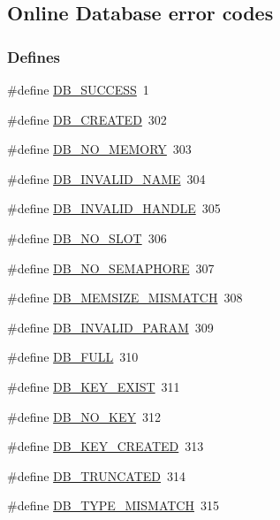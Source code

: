\subsection{Online Database error codes}
\label{group__err23}
\subsubsection*{Defines}
\begin{DoxyCompactItemize}
\item 
\#define \hyperlink{group__err23_ga4d6ab4d32144d851ddeb7931b81a63e3}{DB\_\-SUCCESS}~1
\item 
\#define \hyperlink{group__err23_gabd18ddb49dba3429ea159610875283ec}{DB\_\-CREATED}~302
\item 
\#define \hyperlink{group__err23_ga53ba0057ac441528c24b8485c80dbbe3}{DB\_\-NO\_\-MEMORY}~303
\item 
\#define \hyperlink{group__err23_ga871ab09b39556a4328e80497ed13088b}{DB\_\-INVALID\_\-NAME}~304
\item 
\#define \hyperlink{group__err23_ga2b43bd45a32dd2121296f02c267ccc6d}{DB\_\-INVALID\_\-HANDLE}~305
\item 
\#define \hyperlink{group__err23_gafbb1117afac5c259b09143378b454dcb}{DB\_\-NO\_\-SLOT}~306
\item 
\#define \hyperlink{group__err23_ga1e4b50982e450b4c6a86a20e9120efbd}{DB\_\-NO\_\-SEMAPHORE}~307
\item 
\#define \hyperlink{group__err23_ga30ce4ec4017c1d210d2b72497aad6835}{DB\_\-MEMSIZE\_\-MISMATCH}~308
\item 
\#define \hyperlink{group__err23_ga3190934848311dc41f20d5e4ce285339}{DB\_\-INVALID\_\-PARAM}~309
\item 
\#define \hyperlink{group__err23_ga25a395a210f89c1a6cfa6efd724657c0}{DB\_\-FULL}~310
\item 
\#define \hyperlink{group__err23_ga2989be8053dffcaf9f4e60ce677e98d3}{DB\_\-KEY\_\-EXIST}~311
\item 
\#define \hyperlink{group__err23_ga8c6c8ed2099cf2468f0c7c6cd475fe7e}{DB\_\-NO\_\-KEY}~312
\item 
\#define \hyperlink{group__err23_ga2d57548d0380a9cd53ba2cc16184705f}{DB\_\-KEY\_\-CREATED}~313
\item 
\#define \hyperlink{group__err23_gaf7d81a3217ef14ed73f3089f51584bd9}{DB\_\-TRUNCATED}~314
\item 
\#define \hyperlink{group__err23_gab284e13875988d7c16d30c8fe7597f5a}{DB\_\-TYPE\_\-MISMATCH}~315

\end{DoxyCompactItemize}
